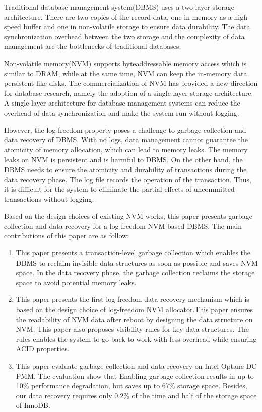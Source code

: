 \begin{abstract*}
  Traditional database management system(DBMS) uses a two-layer storage architecture.
  There are two copies of the record data, one in memory as a high-speed buffer and one in non-volatile storage to ensure data durability.
  The data synchronization overhead between the two storage and the complexity of data management are the bottlenecks of traditional databases.

  Non-volatile memory(NVM) supports byteaddressable memory access which is similar to DRAM, while at the same time, NVM can keep the
  in-memory data persistent like disks.
  The commercialization of NVM has provided a new direction for database research, namely the adoption of a single-layer storage architecture.
  A single-layer architecture for database management systems can reduce the overhead of data synchronization and make the system run without logging.

  However, the log-freedom property poses a challenge to garbage collection  and data recovery of DBMS.
  With no logs, data management cannot guarantee the atomicity of memory allocation, which can lead to memory leaks.
  The memory leaks on NVM is persistent and is harmful to DBMS.
  On the other hand, the DBMS needs to ensure the atomicity and durability of transactions during the data recovery phase.
  The log file records the operation of the transaction. Thus, it is difficult for the system to eliminate the partial effects of uncommitted transactions without logging.

  Based on the design choices of existing NVM works, this paper presents garbage collection and data recovery for a log-freedom NVM-based DBMS.
  The main contributions of this paper are as follow:

  \begin{enumerate}
    \item This paper presents a transaction-level garbage collection which enables the DBMS to reclaim invisible data structures as soon as possible and saves NVM space. In the data recovery phase, the garbage collection reclaims the storage space to avoid potential memory leaks.
    \item This paper presents the first log-freedom data recovery mechanism which is based on the design choice of log-freedom NVM allocator.This paper ensures the readability of NVM data after reboot by designing the data structure on NVM. This paper also proposes visibility rules for key data structures. The rules enables the system to go back to work with less overhead while ensuring ACID properties.
    \item  This paper evaluate garbage collection and data recovery on Intel Optane DC PMM. The evaluation show that Enabling garbage collection results in up to
          10\% performance degradation, but saves up to 67\% storage space. Besides, our data recovery requires only 0.2\%
          of the time and half of the storage space of InnoDB.

  \end{enumerate}


\end{abstract*}

